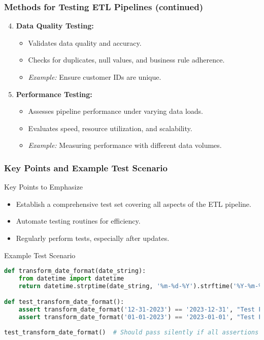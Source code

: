 \documentclass[aspectratio=169]{beamer}
\begin{document}
\begin{frame}[fragile]
    \frametitle{Methods for Testing ETL Pipelines (continued)}
    
    \begin{enumerate}
        \setcounter{enumi}{3}
        
        \item \textbf{Data Quality Testing:}
        \begin{itemize}
            \item Validates data quality and accuracy.
            \item Checks for duplicates, null values, and business rule adherence.
            \item \textit{Example:} Ensure customer IDs are unique.
        \end{itemize}
        
        \item \textbf{Performance Testing:}
        \begin{itemize}
            \item Assesses pipeline performance under varying data loads.
            \item Evaluates speed, resource utilization, and scalability.
            \item \textit{Example:} Measuring performance with different data volumes.
        \end{itemize}
    \end{enumerate}
\end{frame}

\begin{frame}[fragile]
    \frametitle{Key Points and Example Test Scenario}
    
    \begin{block}{Key Points to Emphasize}
        \begin{itemize}
            \item Establish a comprehensive test set covering all aspects of the ETL pipeline.
            \item Automate testing routines for efficiency.
            \item Regularly perform tests, especially after updates.
        \end{itemize}
    \end{block}
    
    \begin{block}{Example Test Scenario}
    \begin{lstlisting}[language=Python]
def transform_date_format(date_string):
    from datetime import datetime
    return datetime.strptime(date_string, '%m-%d-%Y').strftime('%Y-%m-%d')

def test_transform_date_format():
    assert transform_date_format('12-31-2023') == '2023-12-31', "Test Failed"
    assert transform_date_format('01-01-2023') == '2023-01-01', "Test Failed"
    
test_transform_date_format()  # Should pass silently if all assertions are true
    \end{lstlisting}
    \end{block}
\end{frame}
\end{document}
